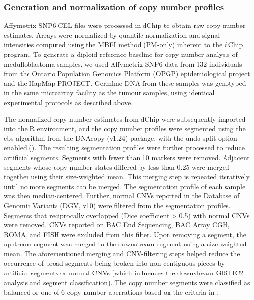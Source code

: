 \subsubsection{Generation and normalization of copy number profiles}

Affymetrix SNP6 CEL files were processed in dChip  to obtain raw copy number estimates.  Arrays were normalized by quantile normalization and signal intensities computed using the MBEI method (PM-only) inherent to the dChip program.  To generate a diploid reference baseline for copy number analysis of medulloblastoma samples, we used Affymetrix SNP6 data from 132 individuals from the Ontario Population Genomics Platform (OPGP) epidemiological project and the HapMap PROJECT.  Germline DNA from these samples was genotyped in the same microarray facility as the tumour samples, using identical experimental protocols as described above.

The normalized copy number estimates from dChip were subsequently imported into the R environment, and the copy number profiles were segmented using the \gls{cbs} algorithm from the DNAcopy (v1.24)  package, with the undo split option enabled (). The resulting segmentation profiles were further processed to reduce artificial segments. Segments with fewer than 10 markers were removed. Adjacent segments whose copy number states differed by less than 0.25 were merged together using their size-weighted mean. This merging step is repeated iteratively until no more segments can be merged. The segmentation profile of each sample was then median-centered. Further, normal CNVs reported in the Database of Genomic Variants (DGV, v10)  were filtered from the segmentation profiles. Segments that reciprocally overlapped (Dice coefficient > 0.5) with normal CNVs were removed. CNVs reported on BAC End Sequencing, BAC Array CGH, ROMA, and FISH were excluded from this filter. Upon removing a segment, the upstream segment was merged to the downstream segment using a size-weighted mean. The aforementioned merging and CNV-filtering steps helped reduce the occurrence of broad segments being broken into non-contiguous pieces by artificial segments or normal CNVs (which influences the downstream GISTIC2 analysis and segment classification). The copy number segments were classified as balanced or one of 6 copy number aberrations based on the criteria in .


